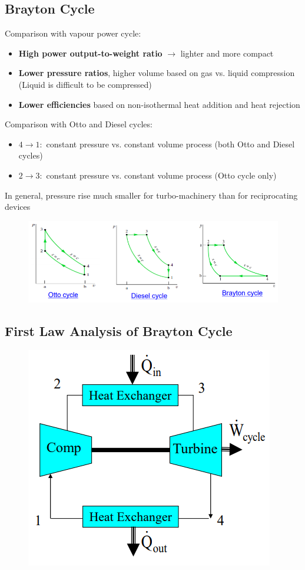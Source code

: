 \documentclass[class=report, crop=false, 12pt,a4paper]{standalone}
\numberwithin{equation}{section}
\begin{document}
\subsection{Brayton Cycle}
Comparison with vapour power cycle:
\begin{itemize}[noitemsep]
  \item \textbf{High power output-to-weight ratio} $\longrightarrow$ lighter and more compact 
  \item \textbf{Lower pressure ratios}, higher volume based on gas vs. liquid compression (Liquid is difficult to be compressed)
  \item \textbf{Lower efficiencies} based on non-isothermal heat addition and heat rejection
\end{itemize}
Comparison with Otto and Diesel cycles:
\begin{itemize}
  \item $4\longrightarrow 1:$ constant pressure vs. constant volume process (both Otto and Diesel cycles)
  \item $2\longrightarrow 3:$ constant pressure vs. constant volume process (Otto cycle only)
\end{itemize}
In general, pressure rise much smaller for turbo-machinery than for reciprocating devices
\begin{figure}[H]
  \centering
  \includegraphics[width = 1 \textwidth]{../img/diagram154.png}
  \caption{}
\end{figure}
\subsection{First Law Analysis of Brayton Cycle}
\begin{figure}[H]
  \centering
  \includegraphics[width = 0.55 \textwidth]{../img/diagram155.png}
  \caption{}
\end{figure}
\end{document}
